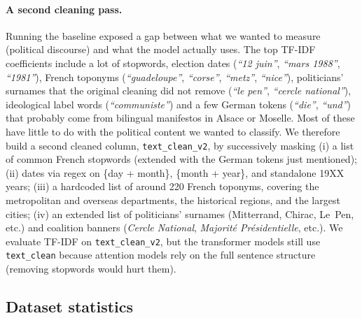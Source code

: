 \documentclass{article}
\begin{document}
\paragraph{A second cleaning pass.}
\label{sec:textcleanv2}
Running the baseline exposed a gap between what we wanted to measure (political discourse) and what the model actually uses. The top TF-IDF coefficients include a lot of stopwords, election dates (\textit{``12 juin''}, \textit{``mars 1988''}, \textit{``1981''}), French toponyms (\textit{``guadeloupe''}, \textit{``corse''}, \textit{``metz''}, \textit{``nice''}), politicians' surnames that the original cleaning did not remove (\textit{``le pen''}, \textit{``cercle national''}), ideological label words (\textit{``communiste''}) and a few German tokens (\textit{``die''}, \textit{``und''}) that probably come from bilingual manifestos in Alsace or Moselle. Most of these have little to do with the political content we wanted to classify. We therefore build a second cleaned column, \texttt{text\_clean\_v2}, by successively masking (i) a list of common French stopwords (extended with the German tokens just mentioned); (ii) dates via regex on \{day + month\}, \{month + year\}, and standalone 19XX years; (iii) a hardcoded list of around 220 French toponyms, covering the metropolitan and overseas departments, the historical regions, and the largest cities; (iv) an extended list of politicians' surnames (Mitterrand, Chirac, Le~Pen, etc.) and coalition banners (\textit{Cercle National}, \textit{Majorité Présidentielle}, etc.). We evaluate TF-IDF on \texttt{text\_clean\_v2}, but the transformer models still use \texttt{text\_clean} because attention models rely on the full sentence structure (removing stopwords would hurt them).

\subsection{Dataset statistics}
\end{document}
